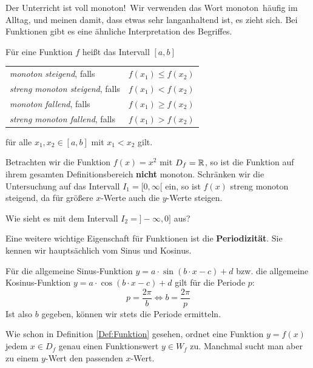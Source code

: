 \documentclass[ngerman, 12pt]{nssheetxea}
\begin{document}
\glqq Der Unterricht ist voll monoton!\grqq \ Wir verwenden das Wort \glqq monoton\grqq \ häufig im Alltag, und meinen damit, dass etwas sehr langanhaltend ist, es zieht sich. Bei Funktionen gibt es eine ähnliche Interpretation des Begriffes.

\begin{definition}
Für eine Funktion $f$ heißt das Intervall $[a,b]$
 
\begin{center}
\begin{tabular}{p{7cm} p{3cm}}
\renewcommand{\arraystretch}{1.7}
\textit{monoton steigend}, falls & $f(x_1)\leq f(x_2)$ \\
\textit{streng monoton steigend}, falls & $f(x_1)<f(x_2)$ \\
\textit{monoton fallend}, falls & $f(x_1)\geq f(x_2)$ \\
\textit{streng monoton fallend}, falls & $f(x_1)>f(x_2)$ \\
\end{tabular}
\end{center}
für alle $x_1, x_2\in [a,b]$ mit $x_1<x_2$ gilt.

\end{definition}

\begin{example}
Betrachten wir die Funktion $f(x)=x^2$ mit $D_f=\mathbb{R}$, so ist die Funktion auf ihrem gesamten Definitionsbereich \textbf{nicht} monoton. Schränken wir die Untersuchung auf das Intervall $I_1=[0,\infty[$ ein, so ist $f(x)$ streng monoton steigend, da für größere $x$-Werte auch die $y$-Werte steigen. \par
Wie sieht es mit dem Intervall $I_2=]-\infty, 0]$ aus?
\end{example}

Eine weitere wichtige Eigenschaft für Funktionen ist die \textbf{Periodizität}. Sie kennen wir hauptsächlich vom Sinus und Kosinus. 

\begin{theorem}
Für die allgemeine Sinus-Funktion $y=a\cdot \sin (b\cdot x - c)+d$ bzw. die allgemeine Kosinus-Funktion $y=a\cdot \cos (b\cdot x - c)+d$ gilt für die Periode $p$:
\[ p = \dfrac{2\pi}{b} \Leftrightarrow b = \dfrac{2\pi}{p} \]
Ist also $b$ gegeben, können wir stets die Periode ermitteln.
\label{Periode_SinCos}
 
\end{theorem}

Wie schon in Definition \ref{Def:Funktion} gesehen, ordnet eine Funktion $y=f(x)$ jedem $x\in D_f$ genau einen Funktionswert $y\in W_f$ zu. Manchmal sucht man aber zu einem $y$-Wert den passenden $x$-Wert.
\end{document}
